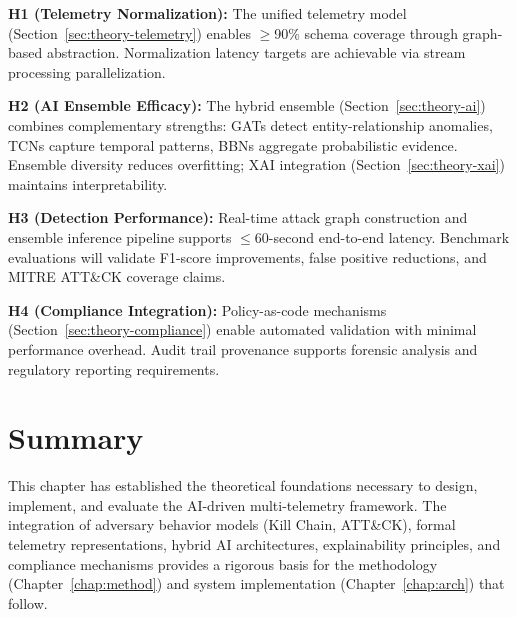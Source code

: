 \textbf{H1 (Telemetry Normalization):} The unified telemetry model (Section~\ref{sec:theory-telemetry}) enables $\geq$90\% schema coverage through graph-based abstraction. Normalization latency targets are achievable via stream processing parallelization.

\textbf{H2 (AI Ensemble Efficacy):} The hybrid ensemble (Section~\ref{sec:theory-ai}) combines complementary strengths: GATs detect entity-relationship anomalies, TCNs capture temporal patterns, BBNs aggregate probabilistic evidence. Ensemble diversity reduces overfitting; XAI integration (Section~\ref{sec:theory-xai}) maintains interpretability.

\textbf{H3 (Detection Performance):} Real-time attack graph construction and ensemble inference pipeline supports $\leq$60-second end-to-end latency. Benchmark evaluations will validate F1-score improvements, false positive reductions, and MITRE ATT\&CK coverage claims.

\textbf{H4 (Compliance Integration):} Policy-as-code mechanisms (Section~\ref{sec:theory-compliance}) enable automated validation with minimal performance overhead. Audit trail provenance supports forensic analysis and regulatory reporting requirements.

\section{Summary}
This chapter has established the theoretical foundations necessary to design, implement, and evaluate the AI-driven multi-telemetry framework. The integration of adversary behavior models (Kill Chain, ATT\&CK), formal telemetry representations, hybrid AI architectures, explainability principles, and compliance mechanisms provides a rigorous basis for the methodology (Chapter~\ref{chap:method}) and system implementation (Chapter~\ref{chap:arch}) that follow.
